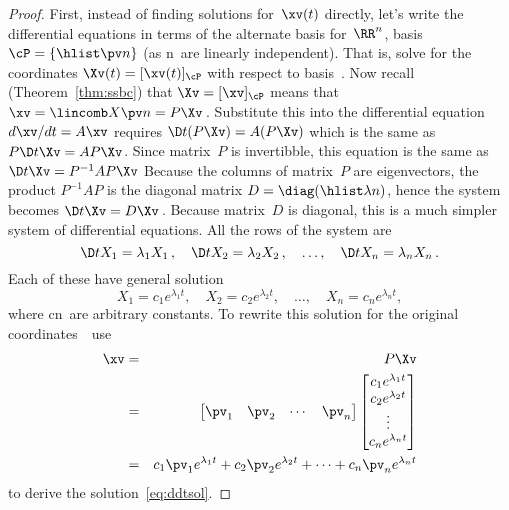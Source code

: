 \begin{proof} 
First, instead of finding solutions for~\(\xv(t)\) directly, let's write the differential equations in terms of the alternate basis for~\(\RR^n\), basis \(\cP=\{\hlist\pv n\}\) (as \hlist\pv n\ are linearly independent).
That is, solve for the coordinates \(\Xv(t)=[\xv(t)]_\cP\) with respect to basis~\cP.
Now recall (Theorem~\ref{thm:ssbc}) that  \(\Xv=[\xv]_\cP\) means that \(\xv=\lincomb X\pv n=P\Xv\)\,.
Substitute this into the differential equation \(d\xv/dt=A\xv\) requires \(\D t{}(P\Xv)=A(P\Xv)\) which is the same as \(P\D t\Xv=AP\Xv\).
Since matrix~\(P\) is invertibble, this equation is the same as \(\D t\Xv=P^{-1}AP\Xv\)
Because the columns of matrix~\(P\) are eigenvectors, the product \(P^{-1}AP\) is the diagonal matrix \(D=\diag(\hlist\lambda n)\), hence the system becomes \(\D t\Xv=D\Xv\)\,.
Because matrix~\(D\) is diagonal, this is a much simpler system of differential equations.
All the rows of the system are
\begin{equation*}
\D t{X_1}=\lambda_1X_1\,,\quad
\D t{X_2}=\lambda_2X_2\,,\quad \ldots,\quad
\D t{X_n}=\lambda_nX_n\,.
\end{equation*}
Each of these have general solution
\begin{equation*}
X_1=c_1e^{\lambda_1t},\quad
X_2=c_2e^{\lambda_2t},\quad \ldots,\quad
X_n=c_ne^{\lambda_nt},
\end{equation*}
where \hlist cn\ are arbitrary constants.
To rewrite this solution for the original coordinates~\xv\ use
\begin{eqnarray*}
\xv&=&P\Xv
\\&=&\begin{bmatrix} \pv_1&\pv_2&\cdots&\pv_n \end{bmatrix}
\begin{bmatrix} c_1e^{\lambda_1t}
\\c_2e^{\lambda_2t}
\\\vdots
\\c_ne^{\lambda_nt} \end{bmatrix}
\\&=&c_1\pv_1e^{\lambda_1t}+c_2\pv_2e^{\lambda_2t}+\cdots+c_n\pv_ne^{\lambda_nt}
\end{eqnarray*}
to derive the solution~\eqref{eq:ddtsol}.


\end{proof}

